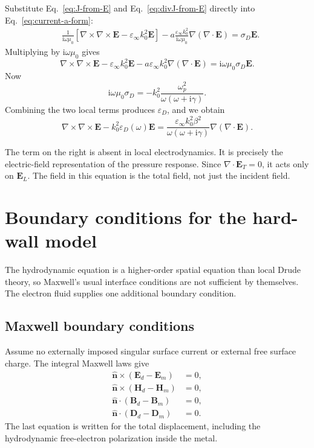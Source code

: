 \documentclass[11pt,a4paper]{article}
\newcommand{\E}{\mathbf E}
\newcommand{\Hfield}{\mathbf H}
\newcommand{\Bfield}{\mathbf B}
\newcommand{\Dfield}{\mathbf D}
\newcommand{\nvec}{\hat{\mathbf n}}
\newcommand{\ii}{\mathrm i}
\newcommand{\eps}{\varepsilon}
\newcommand{\epsinf}{\varepsilon_\infty}
\newcommand{\omegap}{\omega_p}
\begin{document}
Substitute Eq.~\eqref{eq:J-from-E} and Eq.~\eqref{eq:divJ-from-E} directly
into Eq.~\eqref{eq:current-a-form}:
\begin{align}
    &\frac{1}{\ii\omega\mu_0}
      \left[\nabla\!\times\!\nabla\!\times\!\E
      -\epsinf k_0^2\E\right]
    -a\frac{\epsinf k_0^2}{\ii\omega\mu_0}
      \nabla(\nabla\!\cdot\!\E)
    =\sigma_D\E.
    \label{eq:substitution-before-multiply}
\end{align}
Multiplying by \(\ii\omega\mu_0\) gives
\begin{equation}
    \nabla\!\times\!\nabla\!\times\!\E
    -\epsinf k_0^2\E
    -a\epsinf k_0^2\nabla(\nabla\!\cdot\!\E)
    =\ii\omega\mu_0\sigma_D\E.
    \label{eq:E-equation-intermediate}
\end{equation}
Now
\begin{equation}
    \ii\omega\mu_0\sigma_D
    =-k_0^2\frac{\omegap^2}{\omega(\omega+\ii\gamma)}.
    \label{eq:sigma-conversion}
\end{equation}
Combining the two local terms produces \(\eps_D\), and we obtain
\begin{equation}
    \boxed{
    \nabla\!\times\!\nabla\!\times\!\E
    -k_0^2\eps_D(\omega)\E
    =\frac{\epsinf k_0^2\beta^2}
           {\omega(\omega+\ii\gamma)}
      \nabla(\nabla\!\cdot\!\E).
    }
    \label{eq:E-only-HDM}
\end{equation}

The term on the right is absent in local electrodynamics.  It is precisely the
electric-field representation of the pressure response.  Since
\(\nabla\!\cdot\!\E_T=0\), it acts only on \(\E_L\).  The field in this
equation is the total field, not just the incident field.

\section{Boundary conditions for the hard-wall model}

The hydrodynamic equation is a higher-order spatial equation than local Drude
theory, so Maxwell's usual interface conditions are not sufficient by
themselves.  The electron fluid supplies one additional boundary condition.

\subsection{Maxwell boundary conditions}

Assume no externally imposed singular surface current or external free surface
charge.  The integral Maxwell laws give
\begin{align}
    \nvec\times(\E_d-\E_m)&=0,
    \label{eq:bc-E-tangential}\\
    \nvec\times(\Hfield_d-\Hfield_m)&=0,
    \label{eq:bc-H-tangential}\\
    \nvec\!\cdot(\Bfield_d-\Bfield_m)&=0,
    \label{eq:bc-B-normal}\\
    \nvec\!\cdot(\Dfield_d-\Dfield_m)&=0.
    \label{eq:bc-D-normal}
\end{align}
The last equation is written for the total displacement, including the
hydrodynamic free-electron polarization inside the metal.
\end{document}
